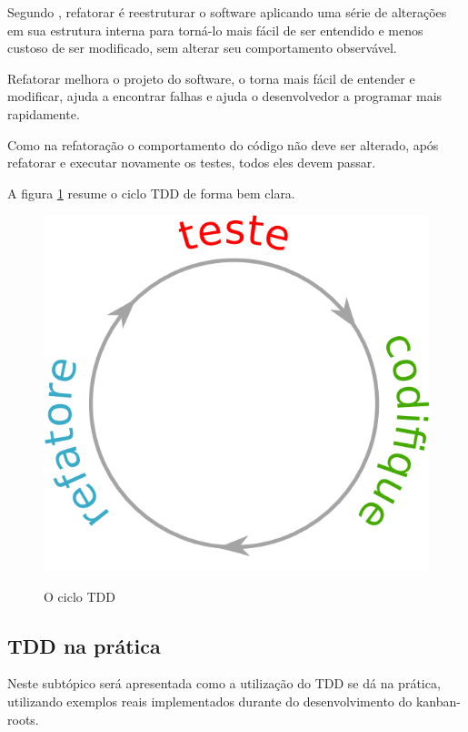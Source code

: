 \begin{enumerate}
Segundo , refatorar é reestruturar o software aplicando uma série de alterações em sua estrutura interna para torná-lo mais fácil de ser entendido e menos custoso de ser modificado, sem alterar seu comportamento observável.

Refatorar melhora o projeto do software, o torna mais fácil de entender e modificar, ajuda a encontrar falhas e ajuda o desenvolvedor a programar mais rapidamente.

Como na refatoração o comportamento do código não deve ser alterado, após refatorar e executar novamente os testes, todos eles devem passar.

\end{enumerate}

A figura \ref{img:ciclo-tdd} resume o ciclo TDD de forma bem clara.

\begin{figure}[h]
  \center
  \caption{O ciclo TDD}
  \includegraphics[scale=0.45]{images/ciclo-tdd}
  \label{img:ciclo-tdd}
\end{figure}

\subsection{TDD na prática}
\label{ssub:tdd_na_pratica}

Neste subtópico será apresentada como a utilização do TDD se dá na prática, utilizando exemplos reais implementados durante do desenvolvimento do kanban-roots.

